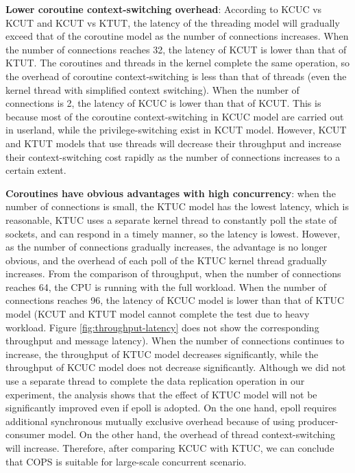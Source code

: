 \documentclass[sigconf,review,anonymous]{acmart}
\begin{document}
\textbf{Lower coroutine context-switching overhead}: According to KCUC vs KCUT and KCUT vs KTUT, the latency of the threading model will gradually exceed that of the coroutine model as the number of connections increases. When the number of connections reaches 32, the latency of KCUT is lower than that of KTUT. The coroutines and threads in the kernel complete the same operation, so the overhead of coroutine context-switching is less than that of threads (even the kernel thread with simplified context switching). When the number of connections is 2, the latency of KCUC is lower than that of KCUT. This is because most of the coroutine context-switching in KCUC model are carried out in userland, while the privilege-switching exist in KCUT model. However, KCUT and KTUT models that use threads will decrease their throughput and increase their context-switching cost rapidly as the number of connections increases to a certain extent.

\textbf{Coroutines have obvious advantages with high concurrency}: when the number of connections is small, the KTUC model has the lowest latency, which is reasonable, KTUC uses a separate kernel thread to constantly poll the state of sockets, and can respond in a timely manner, so the latency is lowest. However, as the number of connections gradually increases, the advantage is no longer obvious, and the overhead of each poll of the KTUC kernel thread gradually increases. From the comparison of throughput, when the number of connections reaches 64, the CPU is running with the full workload. When the number of connections reaches 96, the latency of KCUC model is lower than that of KTUC model (KCUT and KTUT model cannot complete the test due to heavy workload. Figure \ref{fig:throughput-latency} does not show the corresponding throughput and message latency). When the number of connections continues to increase, the throughput of KTUC model decreases significantly, while the throughput of KCUC model does not decrease significantly. Although we did not use a separate thread to complete the data replication operation in our experiment, the analysis shows that the effect of KTUC model will not be significantly improved even if epoll is adopted. On the one hand, epoll requires additional synchronous mutually exclusive overhead because of using producer-consumer model. On the other hand, the overhead of thread context-switching will increase. Therefore, after comparing KCUC with KTUC, we can conclude that COPS is suitable for large-scale concurrent scenario.
\end{document}
